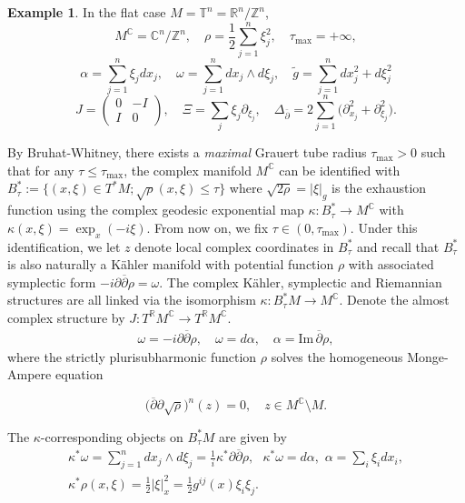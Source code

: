 \documentclass[11pt,reqno]{amsart}
\newcommand{\R}{{\mathbb R}}
\newcommand{\I}{{\mathbb I}}
\newcommand{\C}{{\mathbb C}}
\newcommand{\Z}{{\mathbb Z}}
\renewcommand{\Im} {\mathrm{Im\,}}
\theoremstyle{definition}
\newtheorem*{Example}{Example}
\def\p{\partial}
\begin{document}
\begin{Example}
In the flat case $M=\mathbb{T}^n=\R^n/\Z^n$,
$$
M^\C=\C^n/\Z^n,\quad \rho=\frac{1}{2}\sum_{j=1}^n\xi_j^2,\quad \tau_{\text{max}}=+\infty,
$$
$$
\alpha=\sum_{j=1}^n\xi_jdx_j,\quad \omega=\sum_{j=1}^n dx_j\wedge d\xi_j,\quad \tilde{g}=\sum_{j=1}^ndx_j^2+d\xi_j^2
$$
$$
J=\begin{pmatrix}
    0&-I\\I&0
\end{pmatrix},\quad  \Xi=\sum_j\xi_j\p_{\xi_j}, \quad\Delta_{\bar\partial}=2 \sum_{j=1}^n \big(\p_{x_j}^2+\p_{\xi_j}^2 \big).
$$
\end{Example}


By Bruhat-Whitney, there exists a {\em maximal} Grauert tube radius $\tau_{\max} >0$ \cite{Z07} such that for any $ \tau \leq \tau_{\max}$, the complex manifold $M^{\C}$ can be identified with $B^*_{\tau} := \{ (x, \xi) \in T^*M; \sqrt{\rho}(x,\xi) \leq \tau \}$ where $\sqrt{2\rho} = |\xi|_g$ is the exhaustion function using the complex geodesic exponential map $ \kappa : B^*_{\tau} \rightarrow  M^{\C}  $ with  $\kappa(x,\xi) = \exp_{x}(- i \xi).$ From now on, we fix $\tau \in (0, \tau_{\max}).$
Under this identification, we  let $z$ denote local complex coordinates in $B^*_{\tau}$ and recall that $B_{\tau}^*$ is also naturally a K\"ahler manifold with potential function $\rho$ with associated symplectic form
$ -i\partial \overline{\partial} \rho = \omega.$  The complex K\"ahler, symplectic and Riemannian structures are all linked via the isomorphism $\kappa: B_{\tau}^*M \to M^{\mathbb C}.$ Denote the almost complex structure by $J: T^{\R} M^{\mathbb{C}} \to T^{\R} M^{\mathbb{C}}$.
\begin{eqnarray} \label{grauertformula}
\omega = -i\partial \overline{\partial} \rho,\quad \omega = d \alpha, \quad \alpha = \Im \overline{\partial} \rho,
\end{eqnarray}
where the strictly plurisubharmonic function $\rho$ solves the homogeneous Monge-Ampere equation \cite{GS91} 
  
$$ \big(  \overline{\partial} \partial \sqrt{\rho} \big)^n (z) = 0, \quad z \in M^{\mathbb C}\setminus M.$$
  
The $\kappa$-corresponding objects  on $B_{\tau}^*M$ are given by
\begin{eqnarray} \label{grauertformula2}
  \kappa^*\omega  = \sum_{j=1}^n dx_j \wedge d\xi_j = \frac{1}{i} \kappa^* \partial \overline{\partial} \rho, \,\,\, \, \kappa^* \omega = d \alpha, \,\, \alpha = \sum_i \xi_i dx_i,\nonumber \\
 \kappa^*\rho(x,\xi) = \frac{1}{2} |\xi|_x^2 = \frac{1}{2} g^{ij}(x) \xi_i \xi_j. \hspace{1in}
 \end{eqnarray}
 
\end{document}
